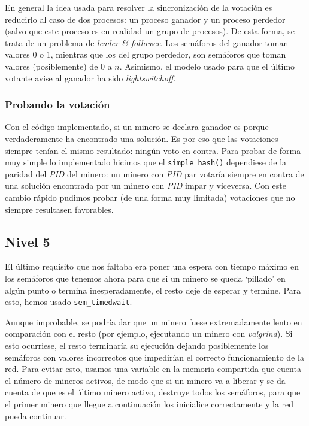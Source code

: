 \documentclass{article}
\begin{document}
En general la idea usada para resolver la sincronización de la votación es reducirlo al caso de dos procesos: un proceso ganador y un proceso perdedor (salvo que este proceso es en realidad un grupo de procesos). De esta forma, se trata de un problema de \textit{leader \& follower}. Los semáforos del ganador toman valores 0 o 1, mientras que los del grupo perdedor, son semáforos que toman valores (posiblemente) de 0 a $n$. Asimismo, el modelo usado para que el último votante avise al ganador ha sido \textit{lightswitchoff}.

\subsubsection*{Probando la votación}

Con el código implementado, si un minero se declara ganador es porque verdaderamente ha encontrado una solución. Es por eso que las votaciones siempre tenían el mismo resultado: ningún voto en contra. Para probar de forma muy simple lo implementado hicimos que el \texttt{simple\_hash()} dependiese de la paridad del \textit{PID} del minero: un minero con \textit{PID} par votaría siempre en contra de una solución encontrada por un minero con \textit{PID} impar y viceversa. Con este cambio rápido pudimos probar (de una forma muy limitada) votaciones que no siempre resultasen favorables.

\subsection*{Nivel 5}

El último requisito que nos faltaba era poner una espera con tiempo máximo en los semáforos que tenemos ahora para que si un minero se queda `pillado' en algún punto o termina inesperadamente, el resto deje de esperar y termine. Para esto, hemos usado \texttt{sem\_timedwait}. 

Aunque improbable, se podría dar que un minero fuese extremadamente lento en comparación con el resto (por ejemplo, ejecutando un minero con \textit{valgrind}). Si esto ocurriese, el resto terminaría su ejecución dejando posiblemente los semáforos con valores incorrectos que impedirían el correcto funcionamiento de la red. Para evitar esto, usamos una variable en la memoria compartida que cuenta el número de mineros activos, de modo que si un minero va a liberar y se da cuenta de que es el último minero activo, destruye todos los semáforos, para que el primer minero que llegue a continuación los inicialice correctamente y la red pueda continuar.
\end{document}
